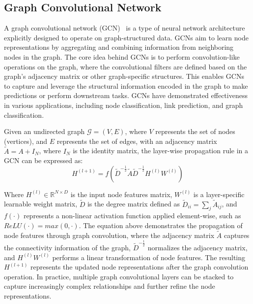 \subsection{Graph Convolutional Network}
\label{subsec:graph_convolutional_network}%

A graph convolutional network (GCN)~\cite{DBLP:journals/corr/KipfW16, daigavane2021understanding} is a type of neural network architecture explicitly designed to operate on graph-structured data.
GCNs aim to learn node representations by aggregating and combining information from neighboring nodes in the graph.
The core idea behind GCNs is to perform convolution-like operations on the graph, where the convolutional filters are defined based on the graph's adjacency matrix or other graph-specific structures.
This enables GCNs to capture and leverage the structural information encoded in the graph to make predictions or perform downstream tasks.
GCNs have demonstrated effectiveness in various applications, including node classification, link prediction, and graph classification.

Given an undirected graph $\mathcal{G} = (V, E)$, where $V$ represents the set of nodes (vertices), and $E$ represents the set of edges, with an adjacency matrix $\tilde{A}=A+I_N$, where $I_N$ is the identity matrix, the layer-wise propagation rule in a GCN can be expressed as:
\begin{equation}
    \label{eq:gcn_convolution}
    H^{(l+1)} = f \left( \tilde{D}^{-\tfrac{1}{2}}  \tilde{A}  \tilde{D}^{-\tfrac{1}{2}}  H^{(l)}  W^{(l)} \right)
\end{equation}

Where $H^{(l)} \in \mathbb{R}^{N \times D}$ is the input node features matrix, $W^{(l)}$ is a layer-specific learnable weight matrix, $\tilde{D}$ is the degree matrix defined as $\tilde{D}_{ii} = \sum_{j} \tilde{A}_{ij}$, and $f(\cdot)$ represents a non-linear activation function applied element-wise, such as $ReLU(\cdot) = max(0, \cdot)$.
The equation above demonstrates the propagation of node features through graph convolution, where the adjacency matrix $\tilde{A}$ captures the connectivity information of the graph, $\tilde{D}^{-\tfrac{1}{2}}$ normalizes the adjacency matrix, and $H^{(l)}  W^{(l)}$ performs a linear transformation of node features.
The resulting $H^{(l+1)}$ represents the updated node representations after the graph convolution operation.
In practice, multiple graph convolutional layers can be stacked to capture increasingly complex relationships and further refine the node representations.

